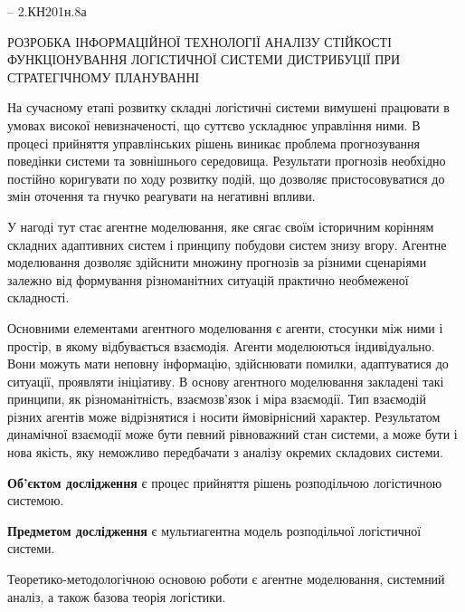


\usepackage{titling}
\usepackage{multicol}




\Ukrainian

\begin{center}
\small
	\textbf{\theauthor} -- 2.КН201н.8а
\end{center}

\begin{center}
\MakeUppercase{Розробка інформаційної технології аналізу стійкості функціонування логістичної системи дистрибуції при стратегічному плануванні}
\end{center}

На сучасному етапі розвитку складні логістичні системи вимушені працювати в умовах високої невизначеності, що суттєво ускладнює управління ними. 
В процесі прийняття управлінських рішень виникає проблема прогнозування поведінки системи та зовнішнього середовища. 
Результати прогнозів необхідно постійно коригувати по ходу розвитку подій, що дозволяє пристосовуватися до змін оточення та гнучко реагувати на негативні впливи. 

У нагоді тут стає агентне моделювання, яке сягає своїм історичним корінням складних адаптивних систем і принципу побудови систем знизу вгору.
Агентне моделювання дозволяє здійснити множину прогнозів за різними сценаріями залежно від формування різноманітних ситуацій практично необмеженої складності. 

Основними елементами агентного моделювання є агенти, стосунки між ними і простір, в якому відбувається взаємодія. 
Агенти моделюються індивідуально. 
Вони можуть мати неповну інформацію, здійснювати помилки, адаптуватися до ситуації, проявляти ініціативу. 
В основу агентного моделювання закладені такі принципи, як різноманітність, взаємозв’язок і міра взаємодії. 
Тип взаємодій різних агентів може відрізнятися і носити ймовірнісний характер. 
Результатом динамічної взаємодії може бути певний рівноважний стан системи, а може бути і нова якість, яку неможливо передбачати з аналізу окремих складових системи.

\textbf{Об'єктом дослідження} є процес прийняття рішень розподільчою логістичною системою. 

\textbf{Предметом дослідження} є мультиагентна модель розподільчої логістичної системи. 

Теоретико-методологічною основою роботи є агентне моделювання, системний аналіз, а також базова теорія логістики.

